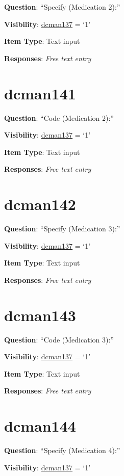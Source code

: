 \documentclass[]{book}
\begin{document}
\textbf{Question}: ``Specify (Medication 2):''

\textbf{Visibility}: \protect\hyperlink{dcman137}{dcman137} = `1'

\textbf{Item Type}: Text input

\textbf{Responses}: \emph{Free text entry}

\hypertarget{dcman141}{%
\section{dcman141}\label{dcman141}}

\textbf{Question}: ``Code (Medication 2):''

\textbf{Visibility}: \protect\hyperlink{dcman137}{dcman137} = `1'

\textbf{Item Type}: Text input

\textbf{Responses}: \emph{Free text entry}

\hypertarget{dcman142}{%
\section{dcman142}\label{dcman142}}

\textbf{Question}: ``Specify (Medication 3):''

\textbf{Visibility}: \protect\hyperlink{dcman137}{dcman137} = `1'

\textbf{Item Type}: Text input

\textbf{Responses}: \emph{Free text entry}

\hypertarget{dcman143}{%
\section{dcman143}\label{dcman143}}

\textbf{Question}: ``Code (Medication 3):''

\textbf{Visibility}: \protect\hyperlink{dcman137}{dcman137} = `1'

\textbf{Item Type}: Text input

\textbf{Responses}: \emph{Free text entry}

\hypertarget{dcman144}{%
\section{dcman144}\label{dcman144}}

\textbf{Question}: ``Specify (Medication 4):''

\textbf{Visibility}: \protect\hyperlink{dcman137}{dcman137} = `1'
\end{document}
